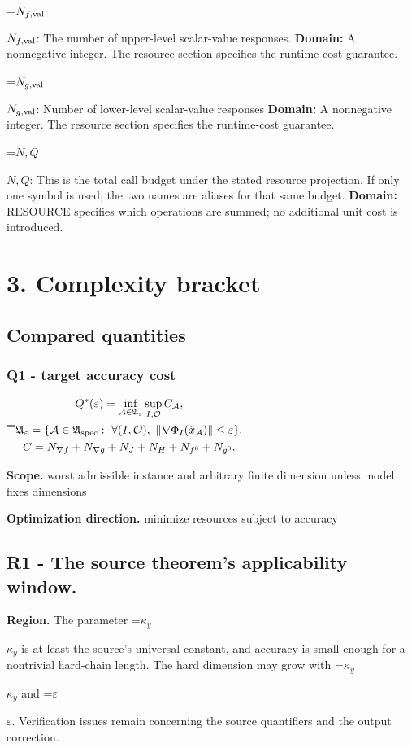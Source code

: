 \documentclass[10pt,a4paper]{article}
\newcommand{\AtlasMath}[1]{\par\begingroup\centering\setbox0=\hbox{$\displaystyle #1$}\ifdim\wd0>1.4\linewidth\typeout{ATLAS WIDE FORMULA: \the\wd0}\fi\ifdim\wd0>\linewidth\resizebox{\linewidth}{!}{\box0}\else\box0\fi\par\endgroup}
\newcommand{\AtlasInlineMath}[1]{\begingroup\setbox0=\hbox{$#1$}\ifdim\wd0>.4\linewidth\endgroup\AtlasMath{#1}\else\endgroup$#1$\fi}
\begin{document}
\AtlasInlineMath{N_{f,\rm val}}: The number of upper-level scalar-value responses. \textbf{Domain:} A nonnegative integer. The resource section specifies the runtime-cost guarantee.

\AtlasInlineMath{N_{g,\rm val}}: Number of lower-level scalar-value responses \textbf{Domain:} A nonnegative integer. The resource section specifies the runtime-cost guarantee.

\AtlasInlineMath{N,Q}: This is the total call budget under the stated resource projection. If only one symbol is used, the two names are aliases for that same budget. \textbf{Domain:} RESOURCE specifies which operations are summed; no additional unit cost is introduced.

\section{3. Complexity bracket}
\subsection{Compared quantities}
\subsubsection{Q1 - target accuracy cost}
\AtlasMath{\begin{gathered}Q^*(\varepsilon)=\inf_{\mathcal A\in\mathfrak A_\varepsilon}\sup_{I,\mathcal O}C_{\mathcal A},\\\mathfrak A_\varepsilon=\{\mathcal A\in\mathfrak A_{\rm spec}:\ \forall(I,\mathcal O),\ \|\nabla\Phi_I(\hat x_{\mathcal A})\|\le\varepsilon\}.\\C=N_{\nabla f}+N_{\nabla g}+N_J+N_H+N_{f^0}+N_{g^0}.\end{gathered}}
\textbf{Scope.} worst admissible instance and arbitrary finite dimension unless model fixes dimensions

\textbf{Optimization direction.} minimize resources subject to accuracy

\subsection{R1 - The source theorem’s applicability window.}
\textbf{Region.} The parameter \AtlasInlineMath{\kappa_y} is at least the source's universal constant, and accuracy is small enough for a nontrivial hard-chain length. The hard dimension may grow with \AtlasInlineMath{\kappa_y} and \AtlasInlineMath{\varepsilon}. Verification issues remain concerning the source quantifiers and the output correction.
\end{document}
